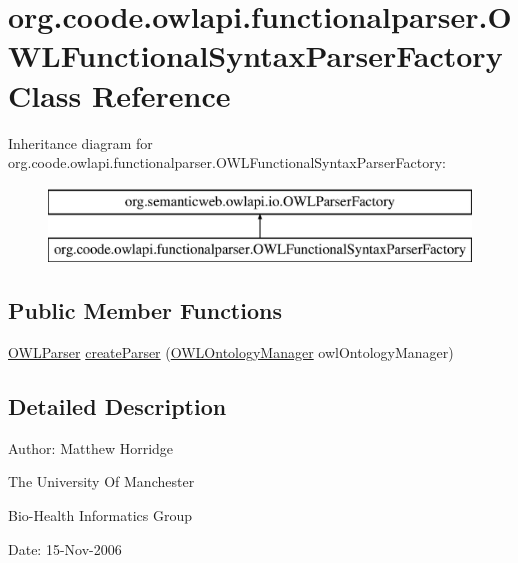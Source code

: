 \hypertarget{classorg_1_1coode_1_1owlapi_1_1functionalparser_1_1_o_w_l_functional_syntax_parser_factory}{\section{org.\-coode.\-owlapi.\-functionalparser.\-O\-W\-L\-Functional\-Syntax\-Parser\-Factory Class Reference}
\label{classorg_1_1coode_1_1owlapi_1_1functionalparser_1_1_o_w_l_functional_syntax_parser_factory}
}
Inheritance diagram for org.\-coode.\-owlapi.\-functionalparser.\-O\-W\-L\-Functional\-Syntax\-Parser\-Factory\-:\begin{figure}[H]
\begin{center}
\leavevmode
\includegraphics[height=2.000000cm]{classorg_1_1coode_1_1owlapi_1_1functionalparser_1_1_o_w_l_functional_syntax_parser_factory}
\end{center}
\end{figure}
\subsection*{Public Member Functions}
\begin{DoxyCompactItemize}
\item 
\hyperlink{interfaceorg_1_1semanticweb_1_1owlapi_1_1io_1_1_o_w_l_parser}{O\-W\-L\-Parser} \hyperlink{classorg_1_1coode_1_1owlapi_1_1functionalparser_1_1_o_w_l_functional_syntax_parser_factory_aee9116cd7a16a9b127da6483894bdfa2}{create\-Parser} (\hyperlink{interfaceorg_1_1semanticweb_1_1owlapi_1_1model_1_1_o_w_l_ontology_manager}{O\-W\-L\-Ontology\-Manager} owl\-Ontology\-Manager)
\end{DoxyCompactItemize}


\subsection{Detailed Description}
Author\-: Matthew Horridge\par
 The University Of Manchester\par
 Bio-\/\-Health Informatics Group\par
 Date\-: 15-\/\-Nov-\/2006\par
\par
 


